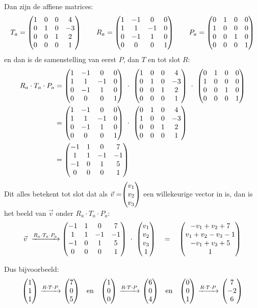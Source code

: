 Dan zijn de affiene matrices:
\[
 T_a = \begin{pmatrix}  1&0&0&4  \\  0&1&0 &-3  \\  0&0&1&2 \\ 0&0&0&1  \end{pmatrix} \qquad
 R_a = \begin{pmatrix}  1&-1&0&0  \\  1&1&-1&0 \\  0&-1&1 &0 \\ 0&0&0&1  \end{pmatrix} \qquad
 P_a = \begin{pmatrix}  0&1&0&0  \\  1&0&0&0  \\  0&0&1 &0  \\ 0&0&0&1  \end{pmatrix} 
\]
en dan is de samenstelling van eerst $P$, dan $T$ en tot slot $R$:
\begin{align*} 
    R_a \cdot  T_a \cdot  P_a &= 
        \matvier{ 1&-1&0&0 } { 1&1&-1&0} { 0&-1&1 &0} {0&0&0&1 }  \ \cdot  \ 
        \matvier{ 1&0&0&4 } { 0&1&0 &-3 } { 0&0&1&2} {0&0&0&1 }  \ \cdot  \ 
        \matvier{ 0&1&0 &0 } { 1&0&0&0 } { 0&0&1 &0 } {0&0&0&1 }  \\
   &= \matvier { 1&-1&0&0 } { 1&1&-1&0}  { 0&-1&1 &0} {0&0&0&1 }  \ \cdot  \ 
      \matvier{ 0&1&0&4 }  { 1&0&0 &-3 } { 0&0&1&2}  {0&0&0&1 }   \\
   &= \matvier{ -1&1&0&7 } { 1&1&-1&-1 } { -1&0&1&5} {0&0&0&1 }  
\end{align*} 
Dit alles betekent tot slot dat als $\vec{v} = \vecdriesnel{v} $ een willekeurige vector in \RD is, dan is  het beeld van $\vec{v}$ onder $R_a \cdot T_a \cdot P_a$:
\[
    \vec{v} \ \xrightarrow{R_a \cdot  T_a \cdot  P_a} \matvier{-1&1&0&7}{ 1&1&-1&-1 }{ -1&0&1&5}{0&0&0&1 } \      \cdot\ \matvier{v_1}{v_2}{v_3}{1}  \quad = \quad
    \matvier{-v_1+v_2+7}{ v_1+v_2-v_3 -1 }{-v_1+v_3+ 5}{1} 
\]

Dus bijvoorbeeld: 
\[
 \vecdrie{1}{1}{1} \ \xrightarrow{R\cdot T\cdot P} \ \vecdrie{7}{0}{5} \quad \text{en} \quad 
 \vecdrie{1}{0}{0} \ \xrightarrow{R\cdot T\cdot P} \ \vecdrie{6}{0}{4} \quad \text{en} \quad 
 \vecdrie{0}{0}{1} \ \xrightarrow{R\cdot T\cdot P} \ \vecdrie{7}{-2}{6}
\]

\newpage
